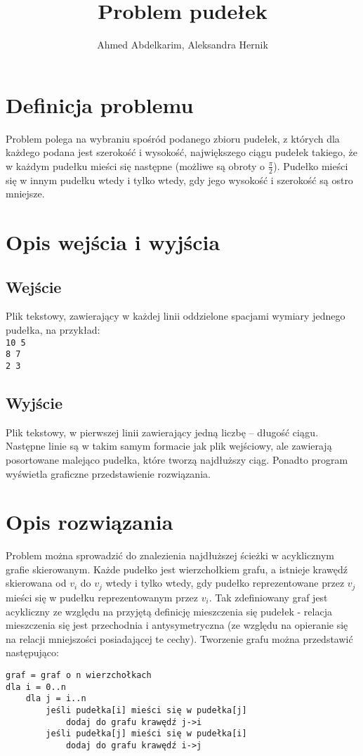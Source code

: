 \documentclass{article}
\title{Problem pudełek}
\author{Ahmed Abdelkarim, Aleksandra Hernik}
\begin{document}
\maketitle
\section{Definicja problemu}
Problem polega na wybraniu spośród podanego zbioru pudełek, z których dla każdego podana jest szerokość i wysokość, największego ciągu pudełek takiego, że w każdym pudełku mieści się następne (możliwe są obroty o $\frac{\pi}{2}$). Pudełko mieści się w innym pudełku wtedy i tylko wtedy, gdy jego wysokość i szerokość są ostro mniejsze. 
\section{Opis wejścia i wyjścia}
\subsection{Wejście}
Plik tekstowy, zawierający w każdej linii oddzielone spacjami wymiary jednego pudełka, na przykład:\\
\texttt{10 5\\8 7\\2 3}
\subsection{Wyjście}
Plik tekstowy, w pierwszej linii zawierający jedną liczbę -- długość ciągu. Następne linie są w takim samym formacie jak plik wejściowy, ale zawierają posortowane malejąco pudełka, które tworzą najdłuższy ciąg. Ponadto program wyświetla graficzne przedstawienie rozwiązania.
\section{Opis rozwiązania}
Problem można sprowadzić do znalezienia najdłuższej ścieżki w acyklicznym grafie skierowanym. Każde pudełko jest wierzchołkiem grafu, a istnieje krawędź skierowana od $v_i$ do $v_j$ wtedy i tylko wtedy, gdy pudełko reprezentowane przez $v_j$ mieści się w pudełku reprezentowanym przez $v_i$. Tak zdefiniowany graf jest acykliczny ze względu na przyjętą definicję mieszczenia się pudełek - relacja mieszczenia się jest przechodnia i antysymetryczna (ze względu na opieranie się na relacji mniejszości posiadającej te cechy). Tworzenie grafu można przedstawić następująco:
\begin{verbatim}
graf = graf o n wierzchołkach
dla i = 0..n
	dla j = i..n
		jeśli pudełka[i] mieści się w pudełka[j]
			dodaj do grafu krawędź j->i
		jeśli pudełka[j] mieści się w pudełka[i]
			dodaj do grafu krawędź i->j
\end{verbatim}
\end{document}
